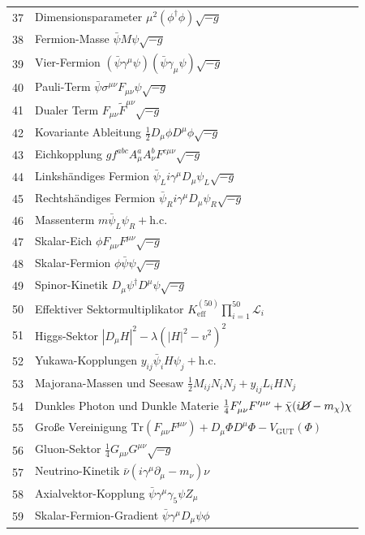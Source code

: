 \documentclass[11pt,a4paper]{article}
\begin{document}
\begin{longtable}{r l}
		37 & Dimensionsparameter \(\mu^2(\phi^\dagger\phi)\sqrt{-g}\) \\
		38 & Fermion-Masse \(\bar{\psi}M\psi\sqrt{-g}\) \\
		39 & Vier-Fermion \((\bar{\psi}\gamma^\mu\psi)(\bar{\psi}\gamma_\mu\psi)\sqrt{-g}\) \\
		40 & Pauli-Term \(\bar{\psi}\sigma^{\mu\nu}F_{\mu\nu}\psi\sqrt{-g}\) \\
		41 & Dualer Term \(F_{\mu\nu}\tilde{F}^{\mu\nu}\sqrt{-g}\) \\
		42 & Kovariante Ableitung \(\frac{1}{2}D_\mu\phi D^\mu\phi\sqrt{-g}\) \\
		43 & Eichkopplung \(g f^{abc}A^a_\mu A^b_\nu F^{c\mu\nu}\sqrt{-g}\) \\
		44 & Linkshändiges Fermion \(\bar{\psi}_L i\gamma^\mu D_\mu\psi_L\sqrt{-g}\) \\
		45 & Rechtshändiges Fermion \(\bar{\psi}_R i\gamma^\mu D_\mu\psi_R\sqrt{-g}\) \\
		46 & Massenterm \(m\bar{\psi}_L\psi_R + \text{h.c.}\) \\
		47 & Skalar-Eich \(\phi F_{\mu\nu}F^{\mu\nu}\sqrt{-g}\) \\
		48 & Skalar-Fermion \(\phi\bar{\psi}\psi\sqrt{-g}\) \\
		49 & Spinor-Kinetik \(D_\mu\psi^\dagger D^\mu\psi\sqrt{-g}\) \\
		50 & Effektiver Sektormultiplikator \(K^{(50)}_{\mathrm{eff}}\prod_{i=1}^{50}\mathcal{L}_i\) \\
		51 & Higgs-Sektor \(|D_\mu H|^2 - \lambda(|H|^2 - v^2)^2\) \\
		52 & Yukawa-Kopplungen \(y_{ij}\bar{\psi}_i H\psi_j + \text{h.c.}\) \\
		53 & Majorana-Massen und Seesaw \(\frac{1}{2}M_{ij}N_i N_j + y_{ij}L_i H N_j\) \\
		54 & Dunkles Photon und Dunkle Materie \(\frac{1}{4}F'_{\mu\nu}F'^{\mu\nu} + \bar{\chi}(i\cancel{D} - m_\chi)\chi\) \\
		55 & Große Vereinigung \(\mathrm{Tr}(F_{\mu\nu}F^{\mu\nu}) + D_\mu\Phi D^\mu\Phi - V_{\text{GUT}}(\Phi)\) \\
		56 & Gluon-Sektor \(\frac{1}{4}G_{\mu\nu}G^{\mu\nu}\sqrt{-g}\) \\
		57 & Neutrino-Kinetik \(\bar{\nu}(i\gamma^\mu\partial_\mu - m_\nu)\nu\) \\
		58 & Axialvektor-Kopplung \(\bar{\psi}\gamma^\mu\gamma_5\psi Z_\mu\) \\
		59 & Skalar-Fermion-Gradient \(\bar{\psi}\gamma^\mu D_\mu\psi\phi\) \\

\end{longtable}
\end{document}
